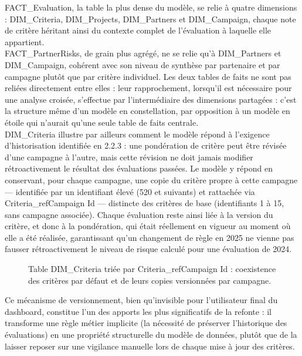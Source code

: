FACT\_Evaluation, la table la plus dense du modèle, se relie à quatre dimensions : 
DIM\_Criteria, DIM\_Projects, DIM\_Partners et DIM\_Campaign, chaque note de critère héritant 
ainsi du contexte complet de l'évaluation à laquelle elle appartient. \\

FACT\_PartnerRisks, de grain plus agrégé, ne se relie qu'à DIM\_Partners et 
DIM\_Campaign, cohérent avec son niveau de synthèse par partenaire et par campagne plutôt 
que par critère individuel. Les deux tables de faits ne sont pas reliées directement entre elles : leur rapprochement, lorsqu'il est nécessaire pour une analyse croisée, s'effectue par 
l'intermédiaire des dimensions partagées : c'est la structure même d'un modèle en 
constellation, par opposition à un modèle en étoile qui n'aurait qu'une seule table de faits 
centrale. \\

DIM\_Criteria illustre par ailleurs comment le modèle répond à l'exigence d'historisation 
identifiée en 2.2.3 : une pondération de critère peut être révisée d'une campagne à l'autre, 
mais cette révision ne doit jamais modifier rétroactivement le résultat des évaluations 
passées. Le modèle y répond en conservant, pour chaque campagne, une copie du critère 
propre à cette campagne — identifiée par un identifiant élevé (520 et suivants) et rattachée 
via Criteria\_refCampaign Id — distincte des critères de base (identifiants 1 à 15, sans 
campagne associée). Chaque évaluation reste ainsi liée à la version du critère, et donc à la 
pondération, qui était réellement en vigueur au moment où elle a été réalisée, garantissant 
qu'un changement de règle en 2025 ne vienne pas fausser rétroactivement le niveau de 
risque calculé pour une évaluation de 2024. 

\begin{figure}[H]
    \centering
    \caption{Table DIM\_Criteria triée par Criteria\_refCampaign Id : coexistence des critères par défaut et de leurs copies versionnées par campagne.}
    \label{Table_DIM_Criteria_triée_par_Criteria_refCampaign_Id}
\end{figure}

Ce mécanisme de versionnement, bien qu'invisible pour l'utilisateur final du dashboard, 
constitue l'un des apports les plus significatifs de la refonte : il transforme une règle métier 
implicite (la nécessité de préserver l'historique des évaluations) en une propriété structurelle 
du modèle de données, plutôt que de la laisser reposer sur une vigilance manuelle lors de 
chaque mise à jour des critères.


